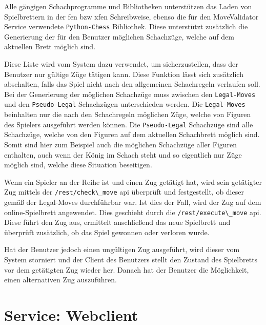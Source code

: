 Alle gängigen Schachprogramme und Bibliotheken unterstützen das Laden
von Spielbrettern in der \gls{fen} bzw \gls{xfen} Schreibweise, ebenso
die für den MoveValidator Service verwendete
\passthrough{\lstinline!Python-Chess!}\cite{pythonchesslib}
Bibliothek. Diese unterstützt zusätzlich die Generierung der für den
Benutzer möglichen Schachzüge, welche auf dem aktuellen Brett möglich
sind.

Diese Liste wird vom System dazu verwendet, um sicherzustellen, dass der
Benutzer nur gültige Züge tätigen kann. Diese Funktion lässt sich
zusätzlich abschalten, falls das Spiel nicht nach den allgemeinen
Schachregeln verlaufen soll. Bei der Generierung der möglichen
Schachzüge muss zwischen den \passthrough{\lstinline!Legal-Moves!} und
den \passthrough{\lstinline!Pseudo-Legal!} Schachzügen unterschieden
werden. Die \passthrough{\lstinline!Legal-Moves!} beinhalten nur die
nach den Schachregeln möglichen Züge, welche von Figuren des Spielers
ausgeführt werden können. Die \passthrough{\lstinline!Pseudo-Legal!}
Schachzüge sind alle Schachzüge, welche von den Figuren auf dem
aktuellen Schachbrett möglich sind. Somit sind hier zum Beispiel auch
die möglichen Schachzüge aller Figuren enthalten, auch wenn der König im
Schach steht und so eigentlich nur Züge möglich sind, welche diese
Situation beseitigen.

Wenn ein Spieler an der Reihe ist und einen Zug getätigt hat, wird sein
getätigter Zug mittels der \passthrough{\lstinline!/rest/check\_move!}
\gls{api} überprüft und festgestellt, ob dieser gemäß der Legal-Moves
durchführbar war. Ist dies der Fall, wird der Zug auf dem
online-Spielbrett angewendet. Dies geschieht durch die
\passthrough{\lstinline!/rest/execute\_move!} \gls{api}. Diese führt den
Zug aus, ermittelt anschließend das neue Spielbrett und überprüft
zusätzlich, ob das Spiel gewonnen oder verloren wurde.

Hat der Benutzer jedoch einen ungültigen Zug ausgeführt, wird dieser vom
System storniert und der Client des Benutzers stellt den Zustand des
Spielbretts vor dem getätigten Zug wieder her. Danach hat der Benutzer
die Möglichkeit, einen alternativen Zug auszuführen.

\hypertarget{service-webclient}{%
\section{Service: Webclient}\label{service-webclient}}

